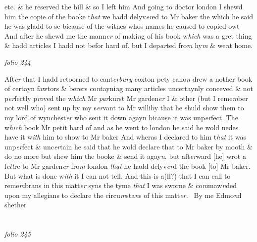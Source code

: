 \documentclass[12pt, a4paper]{book}
\begin{document}
               etc.
			 \& he reserved the bill \& so I left him And going to doctor london I shewd him the copie of the booke t\textit{hat} we hadd delyv\textit{er}ed to Mr baker the which he said he was gladd to se bicause of the witnes whos names he caused to copied owt And after he  shewd me the mann\textit{er} of maki\textit{n}g of his book w\textit{hich} was a gret thing \& hadd articles I hadd not befor hard of. but I dep\textit{ar}ted fro\textit{m} hy\textit{m} \& we\textit{n}t home.

\dotfill
					

\textit{folio 244}


Aft\textit{er} that I hadd retoorned to cant\textit{erbury} coxton pety cano\textit{n} drew a nother book of certayn fawtors \& berers co\textit{n}tayni\textit{n}g many articles uncertaynly conceved \& not p\textit{er}fectly p\textit{ro}ved the w\textit{hich} Mr \textit{par}kurst Mr garden\textit{er} I \& other (but I reme\textit{m}ber not well who) sent up by my s\textit{er}vant to Mr williby that  he shuld show them to my lord of wynchest\textit{er} who sent it down agayn bicause it was unp\textit{er}fect. The w\textit{hich} book Mr petit hard of and as he went to london he said he wold nedes have it w\textit{ith} him to show to Mr baker And wheras I declared to him t\textit{hat} it was unp\textit{er}fect \& unc\textit{er}tain he said that he wold declare that to Mr baker by mooth \& do no more but shew him the booke \& send it agay\textit{n}. but aft\textit{er}ward [he]  wrot a l\textit{ett}re to Mr garden\textit{er} fro\textit{m} london \textit{that} he hadd delyv\textit{er}d the book [to] Mr baker. But what is done w\textit{ith }it I can not tell. And this is
			 a(ll?) that I can call to reme\textit{m}brans in this matt\textit{er} syns the tyme \textit{that} I was sworne \& co\textit{m}maw\textit{n}ded upon my allegians to declare the circu\textit{m}sta\textit{n}s of  this matt\textit{er.}  By me Edmo\textit{n}d shether

\dotfill
					  \section*{}

\textit{folio 245}
\end{document}
